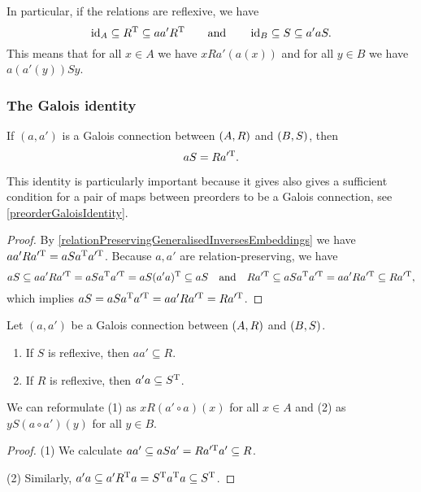 In particular, if the relations are reflexive, we have
\[ \operatorname{id}_A \subseteq R^{\mathrm{T}} \subseteq aa'R^{\mathrm{T}} \qquad\text{and}\qquad \operatorname{id}_B \subseteq S \subseteq a'aS. \]
This means that for all $x\in A$ we have $ xRa'(a(x))$ and for all $y\in B$ we have $a(a'(y))Sy$.

\subsubsection{The Galois identity}
\begin{proposition} \label{GaloisIdentity}
If $(a,a')$ is a Galois connection between $\sSet{A,R}$ and $\sSet{B,S}$, then
\[ aS = Ra^{\prime \mathrm{T}}. \]
\end{proposition}
This identity is particularly important because it gives also gives a sufficient condition for a pair of maps between preorders to be a Galois connection, see \ref{preorderGaloisIdentity}.
\begin{proof}
By \ref{relationPreservingGeneralisedInversesEmbeddings} we have $aa'R a^{\prime\mathrm{T}} = aSa^{\mathrm{T}} a^{\prime\mathrm{T}}$. Because $a,a'$ are relation-preserving, we have
\[ aS \subseteq aa'R a^{\prime\mathrm{T}} = aSa^{\mathrm{T}} a^{\prime\mathrm{T}} = aS(a'a)^{\mathrm{T}} \subseteq aS \quad\text{and}\quad Ra^{\prime\mathrm{T}} \subseteq aSa^{\mathrm{T}} a^{\prime\mathrm{T}} = aa'R a^{\prime\mathrm{T}} \subseteq Ra^{\prime\mathrm{T}}, \]
which implies $aS = aSa^{\mathrm{T}} a^{\prime\mathrm{T}} = aa'R a^{\prime\mathrm{T}} = Ra^{\prime\mathrm{T}}$.
\end{proof}
\begin{corollary} \label{reflexiveGaloisCorollary}
Let $(a,a')$ be a Galois connection between $\sSet{A,R}$ and $\sSet{B,S}$.
\begin{enumerate}
\item If $S$ is reflexive, then $aa' \subseteq R$.
\item If $R$ is reflexive, then $a'a \subseteq S^{\mathrm{T}}$.
\end{enumerate}
\end{corollary}
We can reformulate (1) as $xR(a'\circ a)(x)$ for all $x\in A$ and (2) as $yS(a\circ a')(y)$ for all $y\in B$.
\begin{proof}
(1) We calculate $aa' \subseteq aSa' = Ra^{\prime \mathrm{T}}a' \subseteq R$.

(2) Similarly, $a'a \subseteq a'R^{\mathrm{T}} a = S^{\mathrm{T}} a^{\mathrm{T}} a \subseteq S^{\mathrm{T}}$.
\end{proof}

